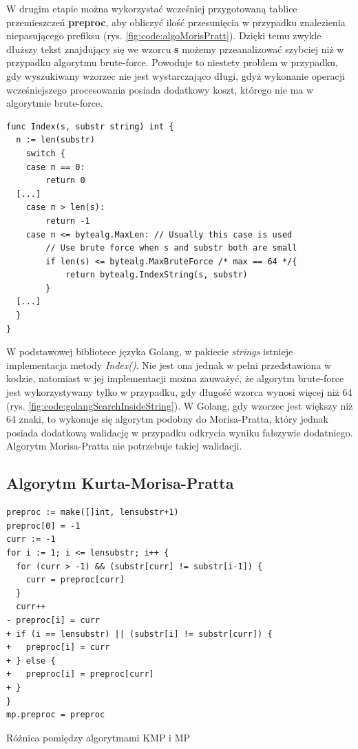 W drugim etapie można wykorzystać wcześniej przygotowaną tablice przemieszczeń 
\textbf{preproc}, aby obliczyć ilość przesunięcia w przypadku znalezienia 
niepasującego prefiksu (rys. \ref{fig:code:algoMorisPratt}). Dzięki temu zwykle 
dłuższy tekst znajdujący się we wzorcu \textbf{s} możemy przeanalizować szybciej
niż w przypadku algorytmu brute-force. Powoduje to niestety problem w przypadku,
gdy wyszukiwany wzorzec nie jest wystarczająco długi, gdyż wykonanie operacji 
wcześniejszego procesowania posiada dodatkowy koszt, którego nie ma w algorytmie brute-force.

\vspace{-3cm} 
\begin{lstlisting}[basicstyle=\small]
func Index(s, substr string) int {
  n := len(substr)
	switch {
	case n == 0:
		return 0
  [...]
	case n > len(s):
		return -1
	case n <= bytealg.MaxLen: // Usually this case is used
		// Use brute force when s and substr both are small
		if len(s) <= bytealg.MaxBruteForce /* max == 64 */{
			return bytealg.IndexString(s, substr)
		}
  [...]
  }
}
\end{lstlisting}
\vspace{-.1cm} 

W podstawowej bibliotece języka Golang, w pakiecie \textit{strings} istnieje 
implementacja metody \textit{Index()}. Nie jest ona jednak w pełni przedstawiona
w kodzie, natomiast w jej implementacji można zauważyć, że algorytm brute-force
jest wykorzystywany tylko w przypadku, gdy długość wzorca wynosi więcej niż 64 
(rys. \ref{fig:code:golangSearchInsideString}). W Golang, gdy wzorzec jest większy niż
64 znaki, to wykonuje się algorytm podobny do Morisa-Pratta, który jednak 
posiada dodatkową walidację w przypadku odkrycia wyniku fałszywie dodatniego. 
Algorytm Morisa-Pratta nie potrzebuje takiej walidacji.

\subsection{Algorytm Kurta-Morisa-Pratta}

\begin{listing}[H]
    \begin{verbatim}
preproc := make([]int, lensubstr+1)
preproc[0] = -1
curr := -1
for i := 1; i <= lensubstr; i++ {
  for (curr > -1) && (substr[curr] != substr[i-1]) {
    curr = preproc[curr]
  }
  curr++
- preproc[i] = curr
+ if (i == lensubstr) || (substr[i] != substr[curr]) {
+   preproc[i] = curr
+ } else {
+   preproc[i] = preproc[curr]
+ }
}
mp.preproc = preproc
    \end{verbatim}
  \caption{Różnica pomiędzy algorytmami KMP i MP}
  \label{fig:code:KurtMorisPrattVsMorisPratt}
\end{listing}

